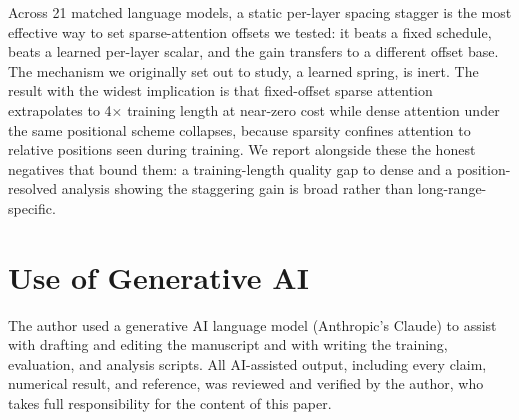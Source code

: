 \documentclass[11pt]{article}
\begin{document}
Across 21 matched language models, a static per-layer spacing stagger is the most
effective way to set sparse-attention offsets we tested: it beats a fixed
schedule, beats a learned per-layer scalar, and the gain transfers to a different
offset base. The mechanism we originally set out to study, a learned spring, is
inert. The result with the widest implication is that fixed-offset sparse
attention extrapolates to 4$\times$ training length at near-zero cost while dense
attention under the same positional scheme collapses, because sparsity confines
attention to relative positions seen during training. We report alongside these
the honest negatives that bound them: a training-length quality gap to dense and a
position-resolved analysis showing the staggering gain is broad rather than
long-range-specific.

\section*{Use of Generative AI}

The author used a generative AI language model (Anthropic's Claude) to assist
with drafting and editing the manuscript and with writing the training,
evaluation, and analysis scripts. All AI-assisted output, including every claim,
numerical result, and reference, was reviewed and verified by the author, who
takes full responsibility for the content of this paper.



\end{document}
